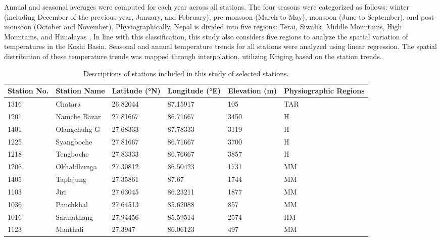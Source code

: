   Annual and seasonal averages were computed for each year across all stations. The four seasons were categorized as follows: winter (including December of the previous year, January, and February), pre-monsoon (March to May), monsoon (June to September), and post-monsoon (October and November). Physiographically, Nepal is divided into five regions: Terai, Siwalik, Middle Mountains, High Mountains, and Himalayas \parencite{nayava_spatial_2017}, In line with this classification, this study also considers five regions to analyze the spatial variation of temperatures in the Koshi Basin. Seasonal and annual temperature trends for all stations were analyzed using linear regression. The spatial distribution of these temperature trends was mapped through interpolation, utilizing Kriging based on the station trends.

\begin{table}[H]
  \centering
  \caption{Descriptions of stations included in this study of selected stations.}
  \label{tab:station_descriptions}
  \begin{tabularx}{\textwidth}{|X|X|X|X|X|X|}
      \toprule %
      \textbf{Station No.} & \textbf{Station Name} & \textbf{Latitude (°N)} & \textbf{Longitude (°E)} & \textbf{Elevation (m)} & \textbf{Physiographic Regions} \\
      \midrule %
      1316 & Chatara           & 26.82044 & 87.15917 & 105  & TAR \\
      1201 & Namche Bazar      & 27.81667 & 86.71667 & 3450 & H \\
      1401 & Olangchuhg G      & 27.68333 & 87.78333 & 3119 & H \\
      1225 & Syangboche        & 27.81667 & 86.71667 & 3700 & H \\
      1218 & Tengboche         & 27.83333 & 86.76667 & 3857 & H \\
      1206 & Okhaldhunga       & 27.30812 & 86.50423 & 1731 & MM \\
      1405 & Taplejung         & 27.35861 & 87.67    & 1744 & MM \\
      1103 & Jiri              & 27.63045 & 86.23211 & 1877 & MM \\
      1036 & Panchkhal         & 27.64513 & 85.62088 & 857  & MM \\
      1016 & Sarmathang        & 27.94456 & 85.59514 & 2574 & HM \\
      1123 & Manthali          & 27.3947  & 86.06123 & 497  & MM \\

\end{tabularx}
\end{table}
